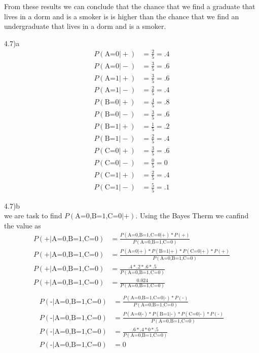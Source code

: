 \documentclass[12pt,english]{article}
\begin{document}
From these results we can conclude that the chance that we find a graduate that lives in a dorm and is a smoker is  is higher than the chance that we find an undergraduate that lives in a dorm and is a smoker.\par
4.7)a\\
\begin{equation}
\begin{split}
P(\mbox{A=0} \vert +) &= \frac{2}{5} = .4\\
P(\mbox{A=0} \vert -) &= \frac{3}{5} = .6\\
P(\mbox{A=1} \vert +) &= \frac{3}{5} = .6\\
P(\mbox{A=1} \vert -) &= \frac{2}{5} = .4\\
P(\mbox{B=0} \vert +) &= \frac{4}{5} = .8\\
P(\mbox{B=0} \vert -) &= \frac{3}{5} = .6\\
P(\mbox{B=1} \vert +) &= \frac{1}{5} = .2\\
P(\mbox{B=1} \vert -) &= \frac{2}{5} = .4\\
P(\mbox{C=0} \vert +) &= \frac{3}{5} = .6\\
P(\mbox{C=0} \vert -) &= \frac{0}{5} = 0\\
P(\mbox{C=1} \vert +) &= \frac{2}{5} = .4\\
P(\mbox{C=1} \vert -) &= \frac{5}{5} = .1
\end{split}
\end{equation}
\par
4.7)b\\
we are task to find $P(\mbox{A=0,B=1,C=0} \vert \mbox{+})$. Using the Bayes Therm we canfind the value as
\begin{equation}
\begin{split}
P(\mbox{+} \vert \mbox{A=0,B=1,C=0}) &= \frac{P(\mbox{A=0,B=1,C=0} \vert \mbox{+}) * P(\mbox{+})}{P(\mbox{A=0,B=1,C=0})}\\
P(\mbox{+} \vert \mbox{A=0,B=1,C=0}) &= \frac{P(\mbox{A=0} \vert \mbox{+}) * P(\mbox{B=1} \vert \mbox{+}) *P(\mbox{C=0} \vert \mbox{+}) * P(\mbox{+})}{P(\mbox{A=0,B=1,C=0})}\\
P(\mbox{+} \vert \mbox{A=0,B=1,C=0}) &= \frac{.4 * .2 *.6 * .5}{P(\mbox{A=0,B=1,C=0})}\\
P(\mbox{+} \vert \mbox{A=0,B=1,C=0}) &= \frac{0.024}{P(\mbox{A=0,B=1,C=0})}\\
\end{split}
\end{equation}
\begin{equation}
\begin{split}
P(\mbox{-} \vert \mbox{A=0,B=1,C=0}) &= \frac{P(\mbox{A=0,B=1,C=0} \vert \mbox{-}) * P(\mbox{-})}{P(\mbox{A=0,B=1,C=0})}\\
P(\mbox{-} \vert \mbox{A=0,B=1,C=0}) &= \frac{P(\mbox{A=0} \vert \mbox{-}) * P(\mbox{B=1} \vert \mbox{-}) *P(\mbox{C=0} \vert \mbox{-}) * P(\mbox{-})}{P(\mbox{A=0,B=1,C=0})}\\
P(\mbox{-} \vert \mbox{A=0,B=1,C=0}) &= \frac{.6 * .4 *0 * .5}{P(\mbox{A=0,B=1,C=0})}\\
P(\mbox{-} \vert \mbox{A=0,B=1,C=0}) &= 0\\
\end{split}
\end{equation}
\end{document}
